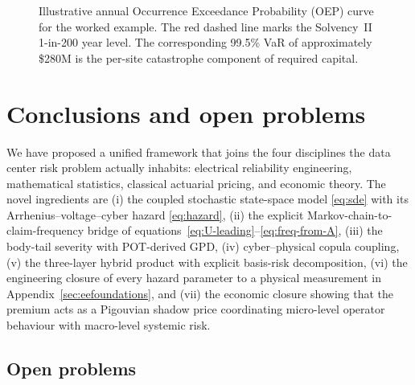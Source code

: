 \documentclass[11pt,a4paper]{article}
\let\origsection\section
\renewcommand{\section}{\clearpage\origsection}
\theoremstyle{ia}
\newcommand{\1}{\mathbf{1}}
\begin{document}
\begin{figure}[ht]
\centering
{}
\caption{Illustrative annual Occurrence Exceedance Probability (OEP)
curve for the worked example. The red dashed line marks the
Solvency~II 1-in-200 year level. The corresponding 99.5\% VaR
of approximately \$280M is the per-site catastrophe component of
required capital.}
\label{fig:oep}
\end{figure}

\section{Conclusions and open problems}\label{sec:conclusion}

We have proposed a unified framework that joins the four disciplines
the data center risk problem actually inhabits: electrical reliability
engineering, mathematical statistics, classical actuarial pricing, and
economic theory. The novel ingredients are (i) the coupled stochastic
state-space model \eqref{eq:sde} with its Arrhenius--voltage--cyber
hazard \eqref{eq:hazard}, (ii) the explicit
Markov-chain-to-claim-frequency bridge of
equations~\eqref{eq:U-leading}--\eqref{eq:freq-from-A}, (iii) the
body-tail severity with POT-derived GPD, (iv) cyber--physical copula
coupling, (v) the three-layer hybrid product with explicit basis-risk
decomposition, (vi) the engineering closure of every hazard parameter
to a physical measurement in Appendix~\ref{sec:eefoundations}, and
(vii) the economic closure showing that the premium acts as a
Pigouvian shadow price coordinating micro-level operator behaviour with
macro-level systemic risk.

\subsection*{Open problems}
\end{document}
